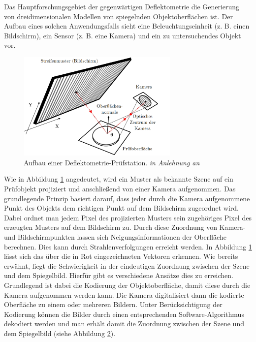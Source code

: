 Das Hauptforschungsgebiet der gegenwärtigen Deflektometrie die Generierung von dreidimensionalen Modellen von spiegelnden Objektoberflächen ist.
Der Aufbau eines solchen Anwendungsfalls sieht eine Beleuchtungseinheit (z. B. einen Bildschirm), ein Sensor (z. B. eine Kamera) und ein zu untersuchendes Objekt vor.

\begin{figure}[H]
	\centering
	\includegraphics[width=0.7\textwidth]{02_grundlagenZurDeflektometrie/rekonstruktion/figures/nature-articel-nr1}
	\caption[Aufbau einer Deflektometrie-Prüfstation]{Aufbau einer Deflektometrie-Prüfstation. \textit{in Anlehnung an} \cite{aufbau}}
	\label{img:aufbau}
\end{figure}

\noindent
Wie in Abbildung \ref{img:aufbau} angedeutet, wird ein Muster als bekannte Szene auf ein Prüfobjekt projiziert und anschließend von einer Kamera aufgenommen.
Das grundlegende Prinzip basiert darauf, dass jeder durch die Kamera aufgenommene Punkt des Objekts dem richtigen Punkt auf dem Bildschirm zugeordnet wird.
Dabei ordnet man jedem Pixel des projizierten Musters sein zugehöriges Pixel des erzeugten Musters auf dem Bildschirm zu.
Durch diese Zuordnung von Kamera- und Bildschirmpunkten lassen sich Neigungsinformationen der Oberfläche berechnen.
Dies kann durch Strahlenverfolgungen erreicht werden.
In Abbildung \ref{img:aufbau} lässt sich das über die in Rot eingezeichneten Vektoren erkennen.
Wie bereits erwähnt, liegt die Schwierigkeit in der eindeutigen Zuordnung zwischen der Szene und dem Spiegelbild.
Hierfür gibt es verschiedene Ansätze dies zu erreichen.
Grundlegend ist dabei die Kodierung der Objektoberfläche, damit diese durch die Kamera aufgenommen werden kann.
Die Kamera digitalisiert dann die kodierte Oberfläche zu einem oder mehreren Bildern.
Unter Berücksichtigung der Kodierung können die Bilder durch einen entsprechenden Software-Algorithmus dekodiert werden und man erhält damit die Zuordnung zwischen der Szene und dem Spiegelbild (siehe Abbildung \ref{tikz:abbKodierungUndDekodierung}).
%
{
	\begin{figure}[H]
		\centering
		
		\label{tikz:abbKodierungUndDekodierung}
	\end{figure}
}

